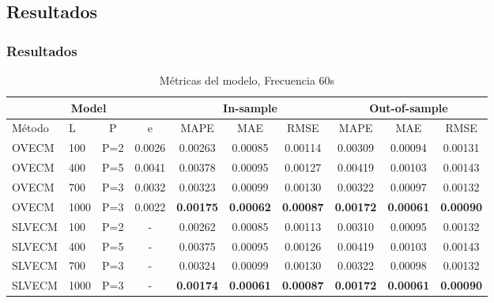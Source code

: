 \documentclass{beamer}
\begin{document}
        \subsection{Resultados}
            \begin{frame}
            \frametitle{Resultados}
            \begin{table}[ht!]
            \caption{Métricas del modelo, Frecuencia 60s}
            \label{tab:mapes_60s}
            \begin{center}
            \begin{adjustbox}{max width=\textwidth}
            \begin{tabular}{|l|l|c|c|c|c|c|c|c|c|}
            \hline
            \multicolumn{4}{|c|}{Model} & \multicolumn{3}{|c|}{In-sample} &
            \multicolumn{3}{|c|}{Out-of-sample} \\
            \hline
            \hline
            Método & L & P & e &
            MAPE & MAE& RMSE&
            MAPE & MAE& RMSE \\
            \hline
             OVECM  &   100  &  P=2& 0.0026  &  0.00263&  0.00085&  0.00114&  0.00309&  0.00094&  0.00131\\
             OVECM  &   400  &  P=5& 0.0041  &  0.00378&  0.00095&  0.00127&  0.00419&  0.00103&  0.00143\\
             OVECM  &   700  &  P=3& 0.0032  &  0.00323&  0.00099&  0.00130&  0.00322&  0.00097&  0.00132\\
             OVECM  &   1000 &  P=3& 0.0022  &
             \textbf{0.00175}&  \textbf{0.00062}&  \textbf{0.00087} &
             \textbf{0.00172}&  \textbf{0.00061}&  \textbf{0.00090}\\
            \hline
             SLVECM  &   100 &  P=2& -  &  0.00262&  0.00085&  0.00113&  0.00310&  0.00095&  0.00132\\
             SLVECM  &   400 &  P=5& -  &  0.00375&  0.00095&  0.00126&  0.00419&  0.00103&  0.00143\\
             SLVECM  &   700 &  P=3& -  &  0.00324&  0.00099&  0.00130&  0.00322&  0.00098&  0.00132\\
             SLVECM  &   1000 &  P=3& -  &
             \textbf{0.00174}&  \textbf{0.00061}&  \textbf{0.00087}&
             \textbf{0.00172}&  \textbf{0.00061}&  \textbf{0.00090}\\
            \hline
            \end{tabular}
            \end{adjustbox}
            \end{center}
            \end{table}

            \end{frame}
\end{document}
